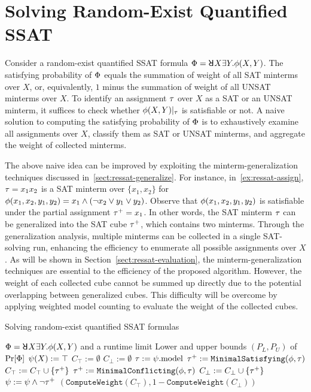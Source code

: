 \section{Solving Random-Exist Quantified SSAT}
\label{sect:ressat-technique}

Consider a random-exist quantified SSAT formula $\Qf=\random{} X \exists Y.\pf(X,Y)$.
The satisfying probability of $\Phi$ equals the summation of weight of all SAT minterms over $X$, or, equivalently,
$1$ minus the summation of weight of all UNSAT minterms over $X$.
To identify an assignment $\tau$ over $X$ as a SAT or an UNSAT minterm,
it suffices to check whether $\phi(X,Y)|_{\tau}$ is satisfiable or not.
A naive solution to computing the satisfying probability of $\Phi$ is to exhaustively examine all assignments over $X$, classify them as SAT or UNSAT minterms, and aggregate the weight of collected minterms.

The above naive idea can be improved by exploiting the minterm-generalization techniques discussed in~\cref{sect:ressat-generalize}.
For instance, in~\cref{ex:ressat-assign},
$\tau=x_1x_2$ is a SAT minterm over $\{x_1,x_2\}$ for $\phi(x_1,x_2,y_1,y_2)=x_1 \land (\lnot x_2 \lor y_1 \lor y_2)$.
Observe that $\phi(x_1,x_2,y_1,y_2)$ is satisfiable under the partial assignment $\tau^+=x_1$.
In other words, the SAT minterm $\tau$ can be generalized into the SAT cube $\tau^+$, which contains two minterms.
Through the generalization analysis, multiple minterms can be collected in a single SAT-solving run,
enhancing the efficiency to enumerate all possible assignments over $X$.
As will be shown in Section~\ref{sect:ressat-evaluation},
the minterm-generalization techniques are essential to the efficiency of the proposed algorithm.
However, the weight of each collected cube cannot be summed up directly due to the potential overlapping between generalized cubes.
This difficulty will be overcome by applying weighted model counting to evaluate the weight of the collected cubes.

\begin{algorithm}[ht]
    \caption{Solving random-exist quantified SSAT formulas}
    \label{alg:ressat}
    \begin{algorithmic}[1]
        \REQUIRE
        $\Qf=\random{} X \exists Y. \pf(X,Y)$ and a runtime limit \timeout
        \ENSURE
        Lower and upper bounds $(P_L,P_U)$ of $\Pr[\Phi]$
        \STATE $\psi(X) := \top$
        \STATE $C_\top := \emptyset$
        \STATE $C_\bot := \emptyset$
        \STATE $\tau := \psi.\mathrm{model}$
        \IF{($\sat{\pcf{\pf}{\as}}$)}
        \STATE $\tau^+ := \texttt{MinimalSatisfying}(\phi,\tau)$
        \STATE $C_\top := C_\top \cup \{\tau^+\}$
        \ELSE
        \STATE $\tau^+ := \texttt{MinimalConflicting}(\phi,\tau)$
        \STATE $C_\bot := C_\bot \cup \{\tau^+\}$
        \ENDIF
        \STATE $\psi := \psi \land \lnot\tau^+$
        \ENDWHILE
        \RETURN $(\texttt{ComputeWeight}(C_\top),1-\texttt{ComputeWeight}(C_\bot))$
    \end{algorithmic}
\end{algorithm}


